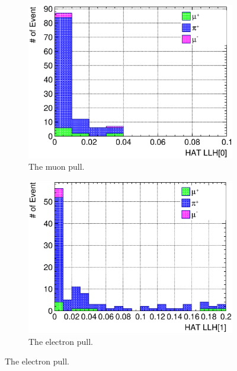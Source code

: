          \begin{figure}[ht]
               \centering
               \begin{subfigure}{\dbfigwid\textwidth}
                    \includegraphics[width=\textwidth]{figures/sel/sspi_TOP_hat_pid0_stack_al5_pid0.eps}
                    \caption{The muon pull.}
                    \label{subfig:sppi-pulls-1-pid0}
               \end{subfigure}
               \begin{subfigure}{\dbfigwid\textwidth}
                    \includegraphics[width=\textwidth]{figures/sel/sspi_TOP_hat_pid1_stack_al5_pid0.eps}
                    \caption{The electron pull.}
                    \label{subfig:sppi-pulls-2-pid0}

\end{subfigure}
\end{figure}
